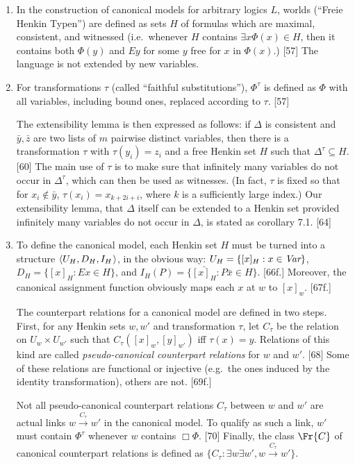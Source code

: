 \documentclass[11pt]{woarticle}
\theoremstyle{break}
\theoremstyle{nonumberplain}
\newcommand{\1}{\;\,|\;\,}
\renewcommand{\t}[1]{\ensuremath{\langle #1  \makebox[.2ex]{}\rangle}}
\begin{document}
{\begin{enumerate}
\item In the construction of canonical models for arbitrary logics
  $L$, worlds (``Freie Henkin Typen'') are defined as sets $H$ of
  formulas which are maximal, consistent, and witnessed (i.e.\
  whenever $H$ contains $\exists x \Phi(x) \in H$, then it contains
  both $\Phi(y)$ and $Ey$ for some $y$ free for $x$ in $\Phi(x)$.)
  [57] The language is not extended by new variables.

\item For transformations $\tau$ (called ``faithful substitutions''),
  $\Phi^\tau$ is defined as $\Phi$ with all variables, including bound
  ones, replaced according to $\tau$. [57]

  The extensibility lemma is then expressed as follows: if $\Delta$ is
  consistent and $\bar{y}, \bar{z}$ are two lists of $m$ pairwise
  distinct variables, then there is a transformation $\tau$ with
  $\tau(y_i) = z_i$ and a free Henkin set $H$ such that $\Delta^\tau
  \subseteq H$. [60] The main use of $\tau$ is to make sure that
  infinitely many variables do not occur in $\Delta^\tau$, which can
  then be used as witnesses. (In fact, $\tau$ is fixed so that for
  $x_i \not\in \bar{y}$, $\tau(x_i) = x_{k+2i+i}$, where $k$ is a
  sufficiently large index.) Our extensibility lemma, that $\Delta$
  itself can be extended to a Henkin set provided infinitely many
  variables do not occur in $\Delta$, is stated as corollary 7.1. [64]

\item To define the canonical model, each Henkin set $H$ must be
  turned into a structure $\t{U_H, D_H, I_H}$, in the obvious way:
  $U_H = \{ [x]_H : x \in \emph{Var} \}$, $D_H = \{ [x]_H : Ex \in H
  \}$, and $I_H(P) = \{ \bar{[x]_H} : P\bar{x} \in H \}$. [66f.]
  Moreover, the canonical assignment function obviously maps each $x$
  at $w$ to $[x]_w$. [67f.]

  The counterpart relations for a canonical model are defined in two
  steps. First, for any Henkin sets $w,w'$ and transformation $\tau$,
  let $C_\tau$ be the relation on $U_w \times U_{w'}$ such that
  $C_\tau([x]_w, [y]_{w'})$ iff $\tau(x)=y$. Relations of this kind
  are called \emph{pseudo-canonical counterpart relations} for $w$ and
  $w'$. [68] Some of these relations are functional or injective
  (e.g.\ the ones induced by the identity transformation), others are
  not. [69f.]

  Not all pseudo-canonical counterpart relations $C_\tau$ between $w$
  and $w'$ are actual links $w \xrightarrow{C_\tau} w'$ in the
  canonical model. To qualify as such a link, $w'$ must contain
  $\Phi^\tau$ whenever $w$ contains $\Box \Phi$. [70] Finally, the
  class $\Fr{C}$ of canonical counterpart relations is defined as $\{
  C_\tau : \exists w \exists w', w \xrightarrow{C_\tau} w' \}$.


\end{enumerate}}
\end{document}

